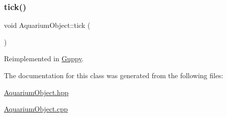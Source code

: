 \subsubsection{\texorpdfstring{tick()}{tick()}}
{\footnotesize\ttfamily void Aquarium\+Object\+::tick (\begin{DoxyParamCaption}{ }\end{DoxyParamCaption})\hspace{0.3cm}{\ttfamily [virtual]}}



Reimplemented in \mbox{\hyperlink{class_guppy_ab2f219fa29b0d22ee9702a55fede519b}{Guppy}}.



The documentation for this class was generated from the following files\+:\begin{DoxyCompactItemize}
\item 
\mbox{\hyperlink{_aquarium_object_8hpp}{Aquarium\+Object.\+hpp}}\item 
\mbox{\hyperlink{_aquarium_object_8cpp}{Aquarium\+Object.\+cpp}}\end{DoxyCompactItemize}
